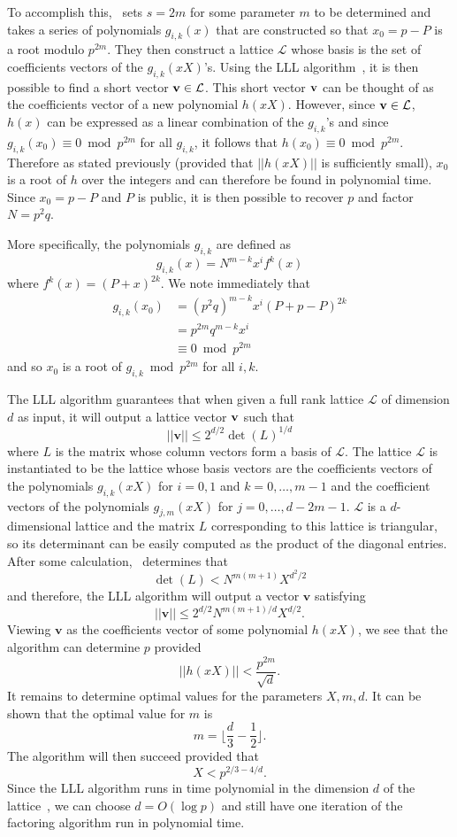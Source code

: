 \documentclass[letterpaper,twocolumn,10pt]{article}
\begin{document}
To accomplish this,~\cite{dan} sets $s = 2m$ for some parameter $m$ to be determined and takes a series of polynomials $g_{i,k}(x)$ that are constructed so that $x_0 = p - P$ is a root modulo $p^{2m}$. They then construct a lattice $\mathcal{L}$ whose basis is the set of coefficients vectors of the $g_{i,k}(xX)$'s. Using the LLL algorithm~\cite{LLL}, it is then possible to find a short vector $\bf{v} \in \mathcal{L}$. This short vector $\bf{v}$ can be thought of as the coefficients vector of a new polynomial $h(xX)$. However, since $\bf{v} \in \mathcal{L}$, $h(x)$ can be expressed as a linear combination of the $g_{i,k}$'s and since $g_{i,k}(x_0) \equiv 0 \bmod p^{2m}$ for all $g_{i,k}$, it follows that $h(x_0) \equiv 0 \bmod p^{2m}$. Therefore as stated previously (provided that $||h(xX)||$ is sufficiently small), $x_0$ is a root of $h$ over the integers and can therefore be found in polynomial time. Since $x_0 = p-P$ and $P$ is public, it is then possible to recover $p$ and factor $N = p^2 q$. 

More specifically, the polynomials $g_{i,k}$ are defined as
\[
g_{i,k}(x) = N^{m-k}x^i f^k(x)
\]
where $f^k(x) = (P+x)^{2k}$. We note immediately that
\begin{align*}
g_{i,k}(x_0) &= (p^2q)^{m-k} x^i (P + p - P)^{2k} \\
&= p^{2m}q^{m-k}x^i \\
&\equiv 0 \bmod p^{2m}
\end{align*}
and so $x_0$ is a root of $g_{i,k} \bmod p^{2m}$ for all $i,k$. 

The LLL algorithm guarantees that when given a full rank lattice $\mathcal{L}$ of dimension $d$ as input, it will output a lattice vector $\bf{v}$ such that
\[
||\textbf{v}|| \leq 2^{d/2} \det(L)^{1/d}
\]
where $L$ is the matrix whose column vectors form a basis of $\mathcal{L}$. The lattice $\mathcal{L}$ is instantiated to be the lattice whose basis vectors are the coefficients vectors of the polynomials $g_{i,k}(xX)$ for $i = 0,1$ and $k = 0, \hdots, m-1$ and the coefficient vectors of the polynomials $g_{j,m}(xX)$ for $j = 0, \hdots, d - 2m - 1$. $\mathcal{L}$ is a $d$-dimensional lattice and the matrix $L$ corresponding to this lattice is triangular, so its determinant can be easily computed as the product of the diagonal entries. After some calculation,~\cite{dan} determines that
\[
\det(L) < N^{m(m+1)}X^{d^2/2}
\] 
and therefore, the LLL algorithm will output a vector $\textbf{v}$ satisfying
\[
||\textbf{v}|| \leq 2^{d/2} N^{m(m+1)/d}X^{d/2}.
\]
Viewing $\textbf{v}$ as the coefficients vector of some polynomial $h(xX)$, we see that the algorithm can determine $p$ provided
\[
||h(xX)|| < \frac{p^{2m}}{\sqrt{d}}.
\]
It remains to determine optimal values for the parameters $X, m, d$. It can be shown that the optimal value for $m$ is
\[
m = \lfloor \frac{d}{3} - \frac{1}{2} \rfloor.
\]
The algorithm will then succeed provided that 
\[
X < p^{2/3 - 4/d}.
\]
Since the LLL algorithm runs in time polynomial in the dimension $d$ of the lattice~\cite{LLL}, we can choose $d = O(\log p)$ and still have one iteration of the factoring algorithm run in polynomial time. 
\end{document}
